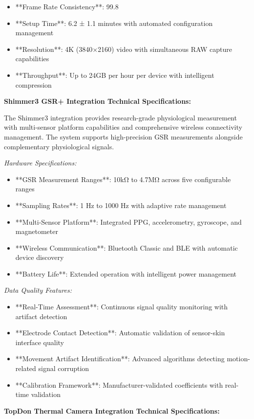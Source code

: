 \documentclass[11pt,a4paper]{article}
\begin{document}
\begin{itemize}
\item **Frame Rate Consistency**: 99.8%
\item **Setup Time**: 6.2 ± 1.1 minutes with automated configuration management
\item **Resolution**: 4K (3840×2160) video with simultaneous RAW capture capabilities
\item **Throughput**: Up to 24GB per hour per device with intelligent compression

\end{itemize}
\textbf{Shimmer3 GSR+ Integration Technical Specifications:}

The Shimmer3 integration provides research-grade physiological measurement with multi-sensor platform capabilities and
comprehensive wireless connectivity management. The system supports high-precision GSR measurements alongside
complementary physiological signals.

\textit{Hardware Specifications:}

\begin{itemize}
\item **GSR Measurement Ranges**: 10kΩ to 4.7MΩ across five configurable ranges
\item **Sampling Rates**: 1 Hz to 1000 Hz with adaptive rate management
\item **Multi-Sensor Platform**: Integrated PPG, accelerometry, gyroscope, and magnetometer
\item **Wireless Communication**: Bluetooth Classic and BLE with automatic device discovery
\item **Battery Life**: Extended operation with intelligent power management

\end{itemize}
\textit{Data Quality Features:}

\begin{itemize}
\item **Real-Time Assessment**: Continuous signal quality monitoring with artifact detection
\item **Electrode Contact Detection**: Automatic validation of sensor-skin interface quality
\item **Movement Artifact Identification**: Advanced algorithms detecting motion-related signal corruption
\item **Calibration Framework**: Manufacturer-validated coefficients with real-time validation

\end{itemize}
\textbf{TopDon Thermal Camera Integration Technical Specifications:}
\end{document}
